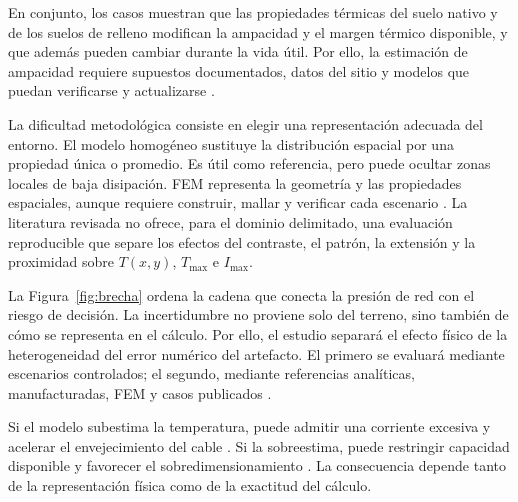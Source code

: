 \documentclass[11pt,a4paper,oneside]{report}
\newcommand{\Tmax}{T_{\max}}
\newcommand{\Imax}{I_{\max}}
\begin{document}
En conjunto, los casos muestran que las propiedades térmicas del suelo nativo y de los suelos de relleno modifican la ampacidad y el margen térmico disponible, y que además pueden cambiar durante la vida útil. Por ello, la estimación de ampacidad requiere supuestos documentados, datos del sitio y modelos que puedan verificarse y actualizarse \parencites{fariz2026}{mobius2025}.

La dificultad metodológica consiste en elegir una representación adecuada del entorno. El modelo homogéneo sustituye la distribución espacial por una propiedad única o promedio. Es útil como referencia, pero puede ocultar zonas locales de baja disipación. FEM representa la geometría y las propiedades espaciales, aunque requiere construir, mallar y verificar cada escenario \parencites[3--4,93--99]{cigre2025}[1--3]{aldulaimi2024}. La literatura revisada no ofrece, para el dominio delimitado, una evaluación reproducible que separe los efectos del contraste, el patrón, la extensión y la proximidad sobre $T(x,y)$, $\Tmax$ e $\Imax$.

La Figura~\ref{fig:brecha} ordena la cadena que conecta la presión de red con el riesgo de decisión. La incertidumbre no proviene solo del terreno, sino también de cómo se representa en el cálculo. Por ello, el estudio separará el efecto físico de la heterogeneidad del error numérico del artefacto. El primero se evaluará mediante escenarios controlados; el segundo, mediante referencias analíticas, manufacturadas, FEM y casos publicados \parencites[4--6]{enescu2021}[3--4,93--99]{cigre2025}.

Si el modelo subestima la temperatura, puede admitir una corriente excesiva y acelerar el envejecimiento del cable \parencite[1--2,9]{khumalo2025}. Si la sobreestima, puede restringir capacidad disponible y favorecer el sobredimensionamiento \parencites[4--6]{enescu2021}[1--2,9]{khumalo2025}. La consecuencia depende tanto de la representación física como de la exactitud del cálculo.

\vspace{0.15cm}
\end{document}
